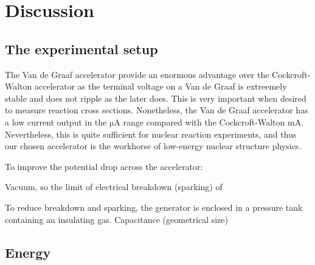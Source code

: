 \section{Discussion}

\subsection{The experimental setup}
The Van de Graaf accelerator provide an enormous advantage over the
Cockcroft-Walton accelerator as the terminal voltage on a Van de Graaf is
extreemely stable and does not ripple as the later does. This is very important
when desired to measure reaction cross sections. Nonetheless, the Van de Graaf
accelerator has a low current output in the $\si{\micro\ampere}$ range compared
with the Cockcroft-Walton $\si{\milli\ampere}$. Nevertheless, this is quite
sufficient for nuclear reaction experiments, and thus our chosen accelerator is
the workhorse of low-energy nuclear structure physics.

To improve the potential drop across the accelerator:

Vacuum, so the limit of electrical breakdown (sparking) of 

To reduce breakdown and sparking, the generator is enclosed in a pressure tank
containing an insulating gas.
Capacitance (geometrical size)
\cite{krane}

\subsection{Energy}


